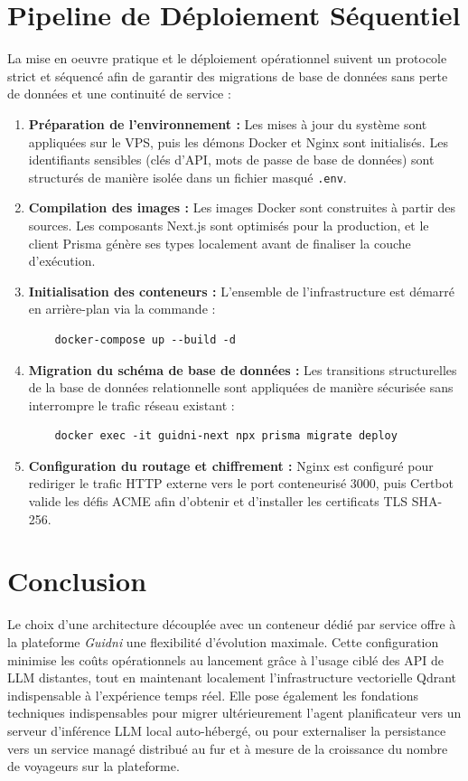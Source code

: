 \section{Pipeline de Déploiement Séquentiel}
La mise en oeuvre pratique et le déploiement opérationnel suivent un protocole strict et séquencé afin de garantir des migrations de base de données sans perte de données et une continuité de service :

\begin{enumerate}
    \item \textbf{Préparation de l'environnement :} Les mises à jour du système sont appliquées sur le VPS, puis les démons Docker et Nginx sont initialisés. Les identifiants sensibles (clés d'API, mots de passe de base de données) sont structurés de manière isolée dans un fichier masqué \texttt{.env}.
    \item \textbf{Compilation des images :} Les images Docker sont construites à partir des sources. Les composants Next.js sont optimisés pour la production, et le client Prisma génère ses types localement avant de finaliser la couche d'exécution.
    \item \textbf{Initialisation des conteneurs :} L'ensemble de l'infrastructure est démarré en arrière-plan via la commande :
    \begin{verbatim}
    docker-compose up --build -d
    \end{verbatim}
    \item \textbf{Migration du schéma de base de données :} Les transitions structurelles de la base de données relationnelle sont appliquées de manière sécurisée sans interrompre le trafic réseau existant :
    \begin{verbatim}
    docker exec -it guidni-next npx prisma migrate deploy
    \end{verbatim}
    \item \textbf{Configuration du routage et chiffrement :} Nginx est configuré pour rediriger le trafic HTTP externe vers le port conteneurisé 3000, puis Certbot valide les défis ACME afin d'obtenir et d'installer les certificats TLS SHA-256.
\end{enumerate}

\section{Conclusion}
Le choix d'une architecture découplée avec un conteneur dédié par service offre à la plateforme \textit{Guidni} une 
flexibilité d'évolution maximale. Cette configuration minimise les coûts opérationnels au lancement grâce à l'usage 
ciblé des API de LLM distantes, tout en maintenant localement l'infrastructure vectorielle Qdrant indispensable à 
l'expérience temps réel. Elle pose également les fondations techniques indispensables pour migrer ultérieurement 
l'agent planificateur vers un serveur d'inférence LLM local auto-hébergé, ou pour externaliser la persistance vers 
un service managé distribué au fur et à mesure de la croissance du nombre de voyageurs sur la plateforme.